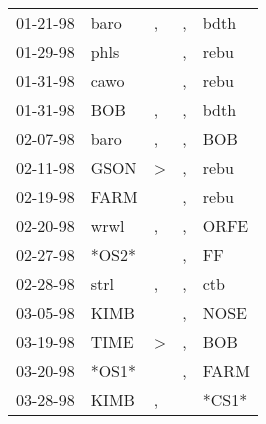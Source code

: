 \begin{supertabular}{p{0.07\textwidth}p{0.06\textwidth}p{0.02\textwidth}p{0.02\textwidth}p{0.06\textwidth}}
          01-21-98\textsuperscript{} &           baro\textsuperscript{} &                , &                , &           bdth\textsuperscript{} \\
          01-29-98\textsuperscript{} &           phls\textsuperscript{} &                  &                , &           rebu\textsuperscript{} \\
          01-31-98\textsuperscript{} &           cawo\textsuperscript{} &                  &                , &           rebu\textsuperscript{} \\
          01-31-98\textsuperscript{} &            BOB\textsuperscript{} &                , &                , &           bdth\textsuperscript{} \\
          02-07-98\textsuperscript{} &           baro\textsuperscript{} &                , &                , &            BOB\textsuperscript{} \\
          02-11-98\textsuperscript{} &           GSON\textsuperscript{} &     \textgreater &                , &           rebu\textsuperscript{} \\
          02-19-98\textsuperscript{} &           FARM\textsuperscript{} &                  &                , &           rebu\textsuperscript{} \\
          02-20-98\textsuperscript{} &           wrwl\textsuperscript{} &                , &                , &           ORFE\textsuperscript{} \\
          02-27-98\textsuperscript{} &                            *OS2* &                  &                , &             FF\textsuperscript{} \\
          02-28-98\textsuperscript{} &           strl\textsuperscript{} &                , &                , &            ctb\textsuperscript{} \\
          03-05-98\textsuperscript{} &           KIMB\textsuperscript{} &                  &                , &           NOSE\textsuperscript{} \\
          03-19-98\textsuperscript{} &           TIME\textsuperscript{} &     \textgreater &                , &            BOB\textsuperscript{} \\
          03-20-98\textsuperscript{} &                            *OS1* &                  &                , &           FARM\textsuperscript{} \\
          03-28-98\textsuperscript{} &           KIMB\textsuperscript{} &                , &                  &                            *CS1* \\

\end{supertabular}
